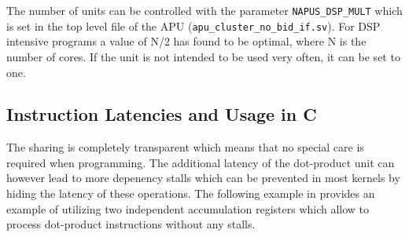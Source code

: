 \documentclass[%
 oneside,      %
 openany,      %
 halfparskip,  %
]{scrbook}
\begin{document}
The number of units can be controlled with the parameter \texttt{NAPUS\_DSP\_MULT} which is set in the top level file of the APU (\texttt{apu\_cluster\_no\_bid\_if.sv}). For DSP intensive programs a value of N/2 has found to be optimal, where N is the number of cores. If the unit is not intended to be used very often, it can be set to one.

\subsection{Instruction Latencies and Usage in C}

The sharing is completely transparent which means that no special care is required when programming. The additional latency of the dot-product unit can however lead to more depenency stalls which can be prevented in most kernels by hiding the latency of these operations. The following example in  provides an example of utilizing two independent accumulation registers which allow to process dot-product instructions without any stalls.
\end{document}
